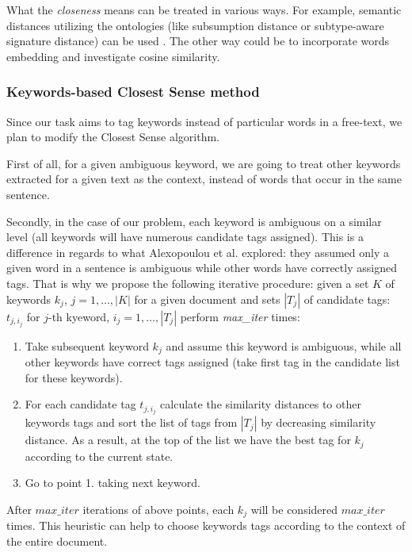 \documentclass[11pt]{article}
\begin{document}
What the \textit{closeness} means can be treated in various ways. For example, semantic distances utilizing the ontologies (like subsumption distance or subtype-aware signature distance) can be used \cite{ClosestSense}. The other way could be to incorporate words embedding and investigate cosine similarity. 

\subsubsection{Keywords-based Closest Sense method}

Since our task aims to tag keywords instead of particular words in a free-text, we plan to modify the Closest Sense algorithm. 

First of all, for a given ambiguous keyword, we are going to treat other keywords extracted for a given text as the context, instead of words that occur in the same sentence. 

Secondly, in the case of our problem, each keyword is ambiguous on a similar level (all keywords will have numerous candidate tags assigned). This is a difference in regards to what Alexopoulou et al.  explored: they assumed only a given word in a sentence is ambiguous while other words have correctly assigned tags. That is why we propose the following iterative procedure: given a set $K$ of keywords $k_j$, $j=1, \ldots, |K|$ for a given document and sets $|T_j|$ of candidate tags: $t_{j,i_j}$  for $j$-th kyeword, $i_j=1, \ldots, |T_j|$ perform \textit{max\_iter} times:
\begin{enumerate}
    \item Take subsequent keyword $k_j$ and assume this keyword is ambiguous, while all other keywords have correct tags assigned (take first tag in the candidate list for these keywords). 
    \item For each candidate tag $t_{j,i_j}$ calculate the similarity distances to other keywords tags and sort the list of tags from $|T_j|$ by decreasing similarity distance. As a result, at the top of the list we have the best tag for $k_j$ according to the current state.
    \item Go to point 1. taking next keyword. 
\end{enumerate}

After $max\_iter$ iterations of above points, each $k_j$ will be considered $max\_iter$ times. This heuristic can help to choose keywords tags according to the context of the entire document. 
\end{document}
